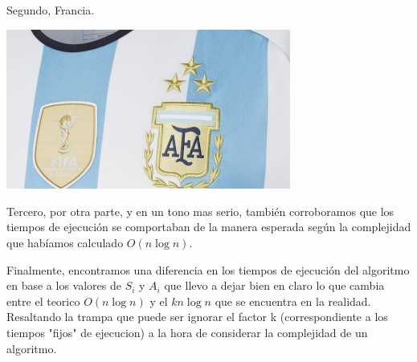 \documentclass{estilo}
\begin{document}
Segundo, Francia.
\begin{center}
\includegraphics[width=0.7\textwidth]{img/Campeones.jpeg}
\end{center}

Tercero, por otra parte, y en un tono mas serio, también corroboramos que los tiempos de ejecución se comportaban de la manera esperada según la complejidad que habíamos calculado $O(n \log n)$.

Finalmente, encontramos una diferencia en los tiempos de ejecución del algoritmo en base a los valores de $S_i$ y $A_i$ que llevo a dejar bien en claro lo que cambia entre el teorico $O(n \log n)$ y el $k n \log n$ que se encuentra en la realidad. Resaltando la trampa que puede ser ignorar el factor k (correspondiente a los tiempos "fijos" de ejecucion) a la hora de considerar la complejidad de un algoritmo.
\end{document}
